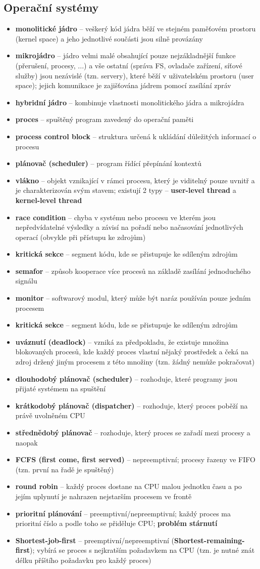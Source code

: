 \documentclass[10pt,final,a4paper]{article}
\newcommand{\row}[2]{\item \textbf{#1} -- #2}
\begin{document}
\subsection{Operační systémy}
\begin{itemize}
	\row{monolitické jádro}{veškerý kód jádra běží ve stejném paměťovém prostoru (kernel space) a jeho jednotlivé součásti jsou silně provázány}
	\row{mikrojádro}{jádro velmi malé obsahující pouze nejzákladnější funkce (přerušení, procesy, ...) a vše ostatní (správa FS, ovladače zařízení, síťové služby) jsou nezávislé \uv{moduly} (tzn. servery), které běží v uživatelském prostoru (user space); jejich komunikace je zajišťována jádrem pomocí zasílání zpráv}
	\row{hybridní jádro}{kombinuje vlastnosti monolitického jádra a mikrojádra}
	\row{proces}{spuštěný program zavedený do operační paměti}
	\row{process control block}{struktura určená k ukládání důležitých informací o procesu}
	\row{plánovač (scheduler)}{program řídící přepínání kontextů}
	\row{vlákno}{objekt vznikající v rámci procesu, který je viditelný pouze uvnitř a je charakterizován svým stavem; existují 2 typy -- \textbf{user-level thread} a \textbf{kernel-level thread}}
	\row{race condition}{chyba v systému nebo procesu ve kterém jsou nepředvídatelné výsledky a závisí na pořadí nebo načasování jednotlivých operací (obvykle při přístupu ke zdrojům)}
	\row{kritická sekce}{segment kódu, kde se přistupuje ke sdíleným zdrojům}
	\row{semafor}{způsob kooperace více procesů na základě zasílání jednoduchého signálu}
	\row{monitor}{softwarový modul, který může být naráz používán pouze jedním procesem}
	\row{kritická sekce}{segment kódu, kde se přistupuje ke sdíleným zdrojům}
	\row{uváznutí (deadlock)}{vzniká za předpokladu, že existuje množina blokovaných procesů, kde každý proces vlastní nějaký prostředek a čeká na zdroj držený jiným procesem z této množiny (tzn. žádný nemůže pokračovat)}
	\row{dlouhodobý plánovač (scheduler)}{rozhoduje, které programy jsou přijaté systémem na spuštění}
	\row{krátkodobý plánovač (dispatcher)}{rozhoduje, který proces poběží na právě uvolněném CPU}
	\row{střednědobý plánovač}{rozhoduje, který proces se zařadí mezi \uv{odložené} procesy a naopak}
	\row{FCFS (first come, first served)}{nepreemptivní; procesy řazeny ve FIFO (tzn. první na řadě je spuštěný)}
	\row{round robin}{každý proces dostane na CPU malou jednotku času a po jejím uplynutí je nahrazen nejstarším procesem ve frontě}
	\row{prioritní plánování}{preemptivní/nepreemptivní; každý proces ma prioritní číslo a podle toho se přiděluje CPU; \textbf{problém stárnutí}}
	\row{Shortest-job-first}{preemptivní/nepreemptivní (\textbf{Shortest-remaining-first}); vybírá se proces s nejkratším požadavkem na CPU (tzn. je nutné znát délku příštího požadavku pro každý proces)}
\end{itemize}
\end{document}
